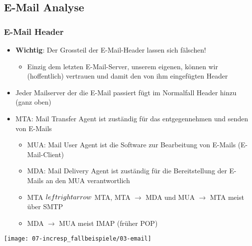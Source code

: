 \subsection{E-Mail Analyse}

\subsubsection{E-Mail Header}
\begin{itemize}
    \item \textbf{Wichtig}: Der Grossteil der E-Mail-Header lassen sich fälschen!
    \begin{itemize}
        \item Einzig dem letzten E-Mail-Server, unserem eigenen, können wir (hoffentlich) vertrauen und damit den von ihm eingefügten Header
    \end{itemize}
    \item Jeder Mailserver der die E-Mail passiert fügt im Normalfall Header hinzu (ganz oben)
    \item MTA: Mail Transfer Agent ist zuständig für das entgegennehmen und senden von E-Mails
    \begin{itemize}
        \item MUA: Mail User Agent ist die Software zur Bearbeitung von E-Mails (E-Mail-Client)
        \item MDA: Mail Delivery Agent ist zuständig für die Bereitstellung der E-Mails an den MUA verantwortlich
        \item MTA $\\leftrightarrow $ MTA, MTA $\rightarrow$ MDA und MUA $\rightarrow$  MTA meist über SMTP
        \item MDA $\rightarrow$ MUA meist IMAP (früher POP)
    \end{itemize}
\end{itemize}

\begin{center}
    \texttt{[image: 07-incresp\_fallbeispiele/03-email]}
\end{center}

